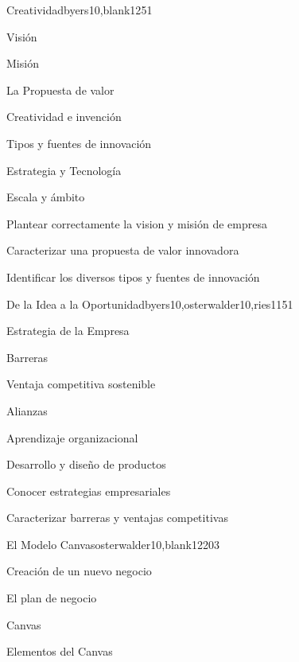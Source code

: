 \begin{syllabus}
\begin{unit}{Creatividad}{byers10,blank12}{5}{1}
\begin{topics}
      \item Visión
      \item Misión
      \item La Propuesta de valor
      \item Creatividad e invención
      \item Tipos y fuentes de innovación
      \item Estrategia y Tecnología
      \item Escala y ámbito
   \end{topics}

   \begin{learningoutcomes}
      \item Plantear correctamente la vision y misión de empresa
	  \item Caracterizar una propuesta de valor innovadora
      \item Identificar los diversos tipos y fuentes de innovación
   \end{learningoutcomes}
\end{unit}

\begin{unit}{De la Idea a la Oportunidad}{byers10,osterwalder10,ries11}{5}{1}
\begin{topics}
      \item Estrategia de la Empresa
      \item Barreras 
      \item Ventaja competitiva sostenible
      \item Alianzas
      \item Aprendizaje organizacional
      \item Desarrollo y diseño de productos
   \end{topics}

   \begin{learningoutcomes}
      \item Conocer estrategias empresariales
      \item Caracterizar barreras y ventajas competitivas 
       
    \end{learningoutcomes}
\end{unit}

\begin{unit}{El Modelo Canvas}{osterwalder10,blank12}{20}{3}
	\begin{topics}
      \item Creación de un nuevo negocio
      \item El plan de negocio 
      \item Canvas
      \item Elementos del Canvas
   \end{topics}


\end{unit}
\end{syllabus}
